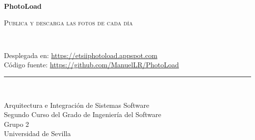 \documentclass{scrartcl}
\begin{document}
\begin{titlepage}
\begin{center}
	\vspace*{-1in}
	\vspace*{2in}
	\begin{Huge}
		\textbf{PhotoLoad} \\
	\end{Huge}
	\vspace*{0.15in}	
	\begin{LARGE}
		\textsc{Publica y descarga las fotos de cada día}
	\end{LARGE}\\
	\vspace*{0.2in}	
	\begin{figure}[H]
		\centering
		\label{fig:logo}
	\end{figure}Desplegada en: \href{https://etsiiphotoload.appspot.com}{https://etsiiphotoload.appspot.com}\\Código fuente: \href{https://github.com/ManuelLR/PhotoLoad}{https://github.com/ManuelLR/PhotoLoad}
	\vspace*{0.1in}
	\rule{140mm}{0.1mm}\\
	\vspace*{0.1in}
	\begin{Large}
	Arquitectura e Integración de Sistemas Software\\	
	Segundo Curso del Grado de Ingeniería del Software\\
	Grupo 2\\
	Universidad de Sevilla\\	


\end{Large}
\end{center}
\end{titlepage}
\end{document}
